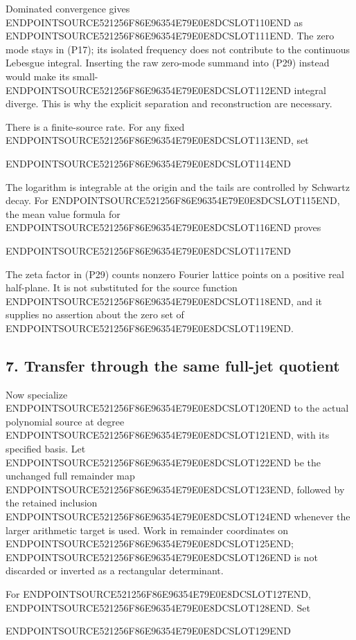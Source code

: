 Dominated convergence gives ENDPOINTSOURCE521256F86E96354E79E0E8DCSLOT110END as ENDPOINTSOURCE521256F86E96354E79E0E8DCSLOT111END. The zero mode stays in (P17); its isolated frequency does not contribute to the continuous Lebesgue integral. Inserting the raw zero-mode summand into (P29) instead would make its small-ENDPOINTSOURCE521256F86E96354E79E0E8DCSLOT112END integral diverge. This is why the explicit separation and reconstruction are necessary.

There is a finite-source rate. For any fixed ENDPOINTSOURCE521256F86E96354E79E0E8DCSLOT113END, set

ENDPOINTSOURCE521256F86E96354E79E0E8DCSLOT114END

The logarithm is integrable at the origin and the tails are controlled by Schwartz decay. For ENDPOINTSOURCE521256F86E96354E79E0E8DCSLOT115END, the mean value formula for ENDPOINTSOURCE521256F86E96354E79E0E8DCSLOT116END proves

ENDPOINTSOURCE521256F86E96354E79E0E8DCSLOT117END

The zeta factor in (P29) counts nonzero Fourier lattice points on a positive real half-plane. It is not substituted for the source function ENDPOINTSOURCE521256F86E96354E79E0E8DCSLOT118END, and it supplies no assertion about the zero set of ENDPOINTSOURCE521256F86E96354E79E0E8DCSLOT119END.

\subsection{7. Transfer through the same full-jet quotient}\label{endpoint-periodized_original--transfer-through-the-same-full-jet-quotient}

Now specialize ENDPOINTSOURCE521256F86E96354E79E0E8DCSLOT120END to the actual polynomial source at degree ENDPOINTSOURCE521256F86E96354E79E0E8DCSLOT121END, with its specified basis. Let ENDPOINTSOURCE521256F86E96354E79E0E8DCSLOT122END be the unchanged full remainder map ENDPOINTSOURCE521256F86E96354E79E0E8DCSLOT123END, followed by the retained inclusion ENDPOINTSOURCE521256F86E96354E79E0E8DCSLOT124END whenever the larger arithmetic target is used. Work in remainder coordinates on ENDPOINTSOURCE521256F86E96354E79E0E8DCSLOT125END; ENDPOINTSOURCE521256F86E96354E79E0E8DCSLOT126END is not discarded or inverted as a rectangular determinant.

For ENDPOINTSOURCE521256F86E96354E79E0E8DCSLOT127END, ENDPOINTSOURCE521256F86E96354E79E0E8DCSLOT128END. Set

ENDPOINTSOURCE521256F86E96354E79E0E8DCSLOT129END

